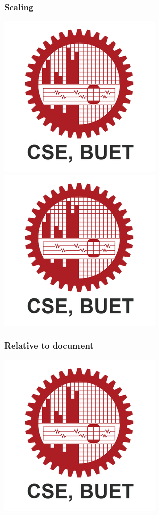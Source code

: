 \documentclass{article}
\begin{document}
\pagebreak


\subsubsection{Scaling}
\includegraphics[scale=.2]{Images/CSE_BUET.png}
\includegraphics[scale=1.2]{Images/CSE_BUET.png}

\pagebreak

\subsubsection{Relative to document}
\includegraphics[width=.5\textwidth]{Images/CSE_BUET.png}
\end{document}
